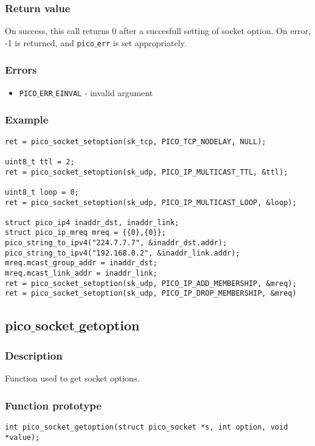 \subsubsection*{Return value}
On success, this call returns 0 after a succesfull setting of socket option.
On error, -1 is returned, and \texttt{pico$\_$err} is set appropriately.

\subsubsection*{Errors}
\begin{itemize}[noitemsep]
\item \texttt{PICO$\_$ERR$\_$EINVAL} - invalid argument
\end{itemize}

\subsubsection*{Example}
\begin{verbatim}
ret = pico_socket_setoption(sk_tcp, PICO_TCP_NODELAY, NULL);

uint8_t ttl = 2;
ret = pico_socket_setoption(sk_udp, PICO_IP_MULTICAST_TTL, &ttl);

uint8_t loop = 0;
ret = pico_socket_setoption(sk_udp, PICO_IP_MULTICAST_LOOP, &loop);

struct pico_ip4 inaddr_dst, inaddr_link;
struct pico_ip_mreq mreq = {{0},{0}};
pico_string_to_ipv4("224.7.7.7", &inaddr_dst.addr);
pico_string_to_ipv4("192.168.0.2", &inaddr_link.addr);
mreq.mcast_group_addr = inaddr_dst;
mreq.mcast_link_addr = inaddr_link;
ret = pico_socket_setoption(sk_udp, PICO_IP_ADD_MEMBERSHIP, &mreq);
ret = pico_socket_setoption(sk_udp, PICO_IP_DROP_MEMBERSHIP, &mreq)
\end{verbatim}


\subsection{pico$\_$socket$\_$getoption}

\subsubsection*{Description}
Function used to get socket options.

\subsubsection*{Function prototype}
\begin{verbatim}
int pico_socket_getoption(struct pico_socket *s, int option, void *value);
\end{verbatim}

